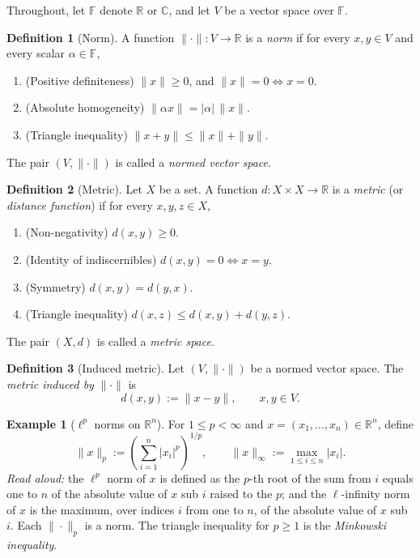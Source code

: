 \documentclass[11pt]{article}
\theoremstyle{definition}
\newtheorem{definition}{Definition}
\newtheorem{example}{Example}
\theoremstyle{plain}
\begin{document}
Throughout, let $\mathbb{F}$ denote $\mathbb{R}$ or $\mathbb{C}$, and let
$V$ be a vector space over $\mathbb{F}$.

\begin{definition}[Norm]
A function $\|\cdot\| \colon V \to \mathbb{R}$ is a \emph{norm} if for
every $x,y \in V$ and every scalar $\alpha \in \mathbb{F}$,
\begin{enumerate}
  \item (Positive definiteness) $\|x\| \ge 0$, and
        $\|x\| = 0 \iff x = 0$.
  \item (Absolute homogeneity) $\|\alpha x\| = |\alpha|\,\|x\|$.
  \item (Triangle inequality) $\|x + y\| \le \|x\| + \|y\|$.
\end{enumerate}
The pair $(V, \|\cdot\|)$ is called a \emph{normed vector space}.
\end{definition}

\begin{definition}[Metric]
Let $X$ be a set. A function $d \colon X \times X \to \mathbb{R}$ is a
\emph{metric} (or \emph{distance function}) if for every $x,y,z \in X$,
\begin{enumerate}
  \item (Non-negativity) $d(x,y) \ge 0$.
  \item (Identity of indiscernibles) $d(x,y) = 0 \iff x = y$.
  \item (Symmetry) $d(x,y) = d(y,x)$.
  \item (Triangle inequality) $d(x,z) \le d(x,y) + d(y,z)$.
\end{enumerate}
The pair $(X, d)$ is called a \emph{metric space}.
\end{definition}

\begin{definition}[Induced metric]
Let $(V, \|\cdot\|)$ be a normed vector space. The \emph{metric induced
by} $\|\cdot\|$ is
\[
  d(x,y) := \|x - y\|, \qquad x,y \in V.
\]
\end{definition}

\begin{example}[$\ell^p$ norms on $\mathbb{R}^n$]
For $1 \le p < \infty$ and $x = (x_1,\dots,x_n) \in \mathbb{R}^n$, define
\[
  \|x\|_p := \left( \sum_{i=1}^n |x_i|^p \right)^{1/p},
  \qquad
  \|x\|_\infty := \max_{1 \le i \le n} |x_i|.
\]
\emph{Read aloud:} the $\ell^p$ norm of $x$ is defined as the $p$-th root
of the sum from $i$ equals one to $n$ of the absolute value of $x$ sub
$i$ raised to the $p$; and the $\ell$-infinity norm of $x$ is the
maximum, over indices $i$ from one to $n$, of the absolute value of $x$
sub $i$.
Each $\|\cdot\|_p$ is a norm. The triangle inequality for $p \ge 1$ is the
\emph{Minkowski inequality}.
\end{example}
\end{document}
